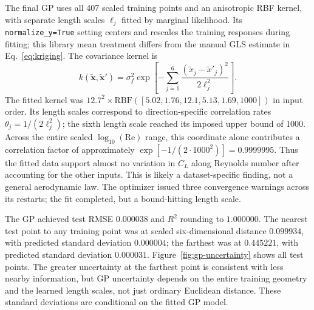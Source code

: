 \documentclass[11pt]{article}
\begin{document}
The final GP uses all 407 scaled training points and an anisotropic RBF kernel, with separate length scales $\ell_j$ fitted by marginal likelihood. Its \texttt{normalize\_y=True} setting centers and rescales the training responses during fitting; this library mean treatment differs from the manual GLS estimate in Eq.~\eqref{eq:kriging}. The covariance kernel is
\begin{equation}
k(\tilde{\mathbf{x}},\tilde{\mathbf{x}}')=\sigma_f^2
\exp\!\left[-\sum_{j=1}^{6}\frac{(\tilde x_j-\tilde x'_j)^2}{2\ell_j^2}\right].
\label{eq:gp-kernel}
\end{equation}
The fitted kernel was $12.7^2\!\times\mathrm{RBF}([5.02,1.76,12.1,5.13,1.69,1000])$ in input order. Its length scales correspond to direction-specific correlation rates $\theta_j=1/(2\ell_j^2)$; the sixth length scale reached its imposed upper bound of 1000. Across the entire scaled $\log_{10}(\mathrm{Re})$ range, this coordinate alone contributes a correlation factor of approximately $\exp[-1/(2\cdot1000^2)]=0.9999995$. Thus the fitted data support almost no variation in $C_L$ along Reynolds number after accounting for the other inputs. This is likely a dataset-specific finding, not a general aerodynamic law. The optimizer issued three convergence warnings across its restarts; the fit completed, but a bound-hitting length scale.

The GP achieved test RMSE $0.000038$ and $R^2$ rounding to $1.000000$. The nearest test point to any training point was at scaled six-dimensional distance $0.099934$, with predicted standard deviation $0.000004$; the farthest was at $0.445221$, with predicted standard deviation $0.000031$. Figure~\ref{fig:gp-uncertainty} shows all test points. The greater uncertainty at the farthest point is consistent with less nearby information, but GP uncertainty depends on the entire training geometry and the learned length scales, not just ordinary Euclidean distance. These standard deviations are conditional on the fitted GP model.

\clearpage
\end{document}

